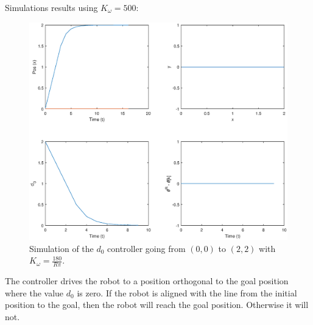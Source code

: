 Simulations results using $K_\omega=500$:

\begin{figure}[H]
    \centering
    \includegraphics[width=\textwidth]{figs/perf-d0.eps}
    
    \caption{Simulation of the $d_0$ controller going from $(0, 0)$ to $(2, 2)$ with $K_\omega= \frac{180}{R \pi}.$}\label{fig:d02002}
\end{figure}

The controller drives the robot to a position orthogonal to the goal position where the value $d_0$ is zero. If the robot is aligned with the line from the initial position to the goal, then the robot will reach the goal position. Otherwise it will not.\textbf{}